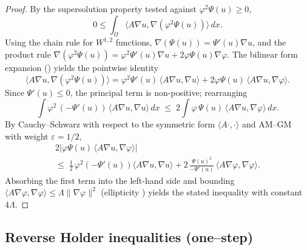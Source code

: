 \begin{proof}
\leanok
{}

By the supersolution property tested against $\varphi^{2}\Psi(u) \geq 0$,
\begin{equation*}
  0 \leq \int_{\Omega} \langle A\nabla u, \nabla(\varphi^{2}\Psi(u))\rangle\,dx.
\end{equation*}
Using the chain rule for $W^{1,2}$ functions, $\nabla(\Psi(u)) = \Psi'(u)\nabla u$,
and the product rule $\nabla(\varphi^{2}\Psi(u)) = \varphi^{2}\Psi'(u)\nabla u
+ 2\varphi\Psi(u)\nabla \varphi$. The bilinear form expansion
() yields the pointwise identity
\begin{equation*}
  \langle A\nabla u, \nabla(\varphi^{2}\Psi(u))\rangle
  = \varphi^{2}\Psi'(u)\,\langle A\nabla u,\nabla u\rangle
  + 2\varphi\Psi(u)\,\langle A\nabla u,\nabla \varphi\rangle.
\end{equation*}
Since $\Psi'(u) \leq 0$, the principal term is non-positive; rearranging
\begin{equation*}
  \int \varphi^{2}\,(-\Psi'(u))\,\langle A\nabla u,\nabla u\rangle\,dx
  \;\leq\;
  2 \int \varphi\,\Psi(u)\,\langle A\nabla u,\nabla \varphi\rangle\,dx.
\end{equation*}
By Cauchy--Schwarz with respect to the symmetric form $\langle A\cdot,\cdot\rangle$
and AM--GM with weight $\varepsilon = 1/2$,
\begin{multline*}
  2|\varphi\Psi(u)\,\langle A\nabla u,\nabla \varphi\rangle|
  \\ \leq\;
  \tfrac12\,\varphi^{2}(-\Psi'(u))\langle A\nabla u,\nabla u\rangle
  + 2\,\frac{\Psi(u)^{2}}{-\Psi'(u)}\,\langle A\nabla \varphi,\nabla \varphi\rangle.
\end{multline*}
Absorbing the first term into the left-hand side and bounding
$\langle A\nabla \varphi,\nabla \varphi\rangle \leq \Lambda \|\nabla \varphi\|^{2}$
(ellipticity ) yields the stated inequality
with constant $4\Lambda$.
\end{proof}

\subsection{Reverse Holder inequalities (one--step)}

